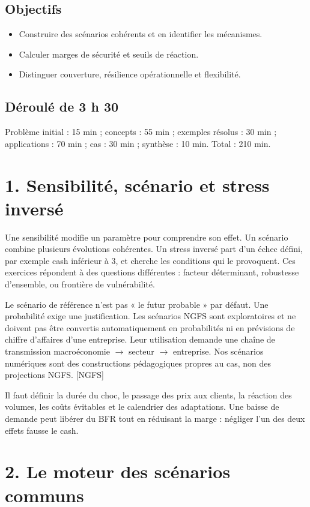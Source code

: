 \documentclass[12pt,a4paper]{article}
\begin{document}
\subsection*{Objectifs}
\begin{itemize}\item Construire des scénarios cohérents et en identifier les mécanismes.\item Calculer marges de sécurité et seuils de réaction.\item Distinguer couverture, résilience opérationnelle et flexibilité.\end{itemize}
\subsection*{Déroulé de 3 h 30}
Problème initial : 15 min ; concepts : 55 min ; exemples résolus : 30 min ; applications : 70 min ; cas : 30 min ; synthèse : 10 min. Total : 210 min.

\section*{1. Sensibilité, scénario et stress inversé}
Une sensibilité modifie un paramètre pour comprendre son effet. Un scénario combine plusieurs évolutions cohérentes. Un stress inversé part d’un échec défini, par exemple cash inférieur à 3, et cherche les conditions qui le provoquent. Ces exercices répondent à des questions différentes : facteur déterminant, robustesse d’ensemble, ou frontière de vulnérabilité.


Le scénario de référence n’est pas « le futur probable » par défaut. Une probabilité exige une justification. Les scénarios NGFS sont exploratoires et ne doivent pas être convertis automatiquement en probabilités ni en prévisions de chiffre d’affaires d’une entreprise. Leur utilisation demande une chaîne de transmission macroéconomie $\rightarrow$ secteur $\rightarrow$ entreprise. Nos scénarios numériques sont des constructions pédagogiques propres au cas, non des projections NGFS. [NGFS]


Il faut définir la durée du choc, le passage des prix aux clients, la réaction des volumes, les coûts évitables et le calendrier des adaptations. Une baisse de demande peut libérer du BFR tout en réduisant la marge : négliger l’un des deux effets fausse le cash.

\section*{2. Le moteur des scénarios communs}
\end{document}
